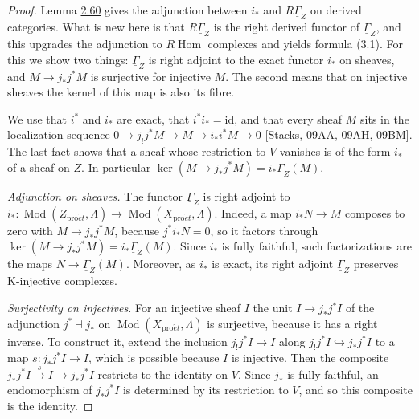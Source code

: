 \documentclass[11pt]{article}
\begin{document}
\begin{proof}[{Proof}]\label{bp258}%
Lemma \hyperref[bp185]{2.60} gives the adjunction between \(i_*\) and \(R\underline\Gamma_Z\) on derived categories. What is new here is that \(R\underline\Gamma_Z\) is the right derived functor of \(\underline\Gamma_Z\), and this upgrades the adjunction to \(R\!\operatorname{Hom}\) complexes and yields formula (3.1). For this we show two things: \(\underline\Gamma_Z\) is right adjoint to the exact functor \(i_*\) on sheaves, and \(M\to j_*j^*M\) is surjective for injective \(M\). The second means that on injective sheaves the kernel of this map is also its fibre.

We use that \(i^*\) and \(i_*\) are exact, that \(i^*i_*=\mathrm{id}\), and that every sheaf \(M\) sits in the localization sequence \(0\to j_!j^*M\to M\to i_*i^*M\to0\) [Stacks, \href{https://stacks.math.columbia.edu/tag/09AA}{09AA}, \href{https://stacks.math.columbia.edu/tag/09AH}{09AH}, \href{https://stacks.math.columbia.edu/tag/09BM}{09BM}]. The last fact shows that a sheaf whose restriction to \(V\) vanishes is of the form \(i_*\) of a sheaf on \(Z\). In particular \(\ker(M\to j_*j^*M)=i_*\underline\Gamma_Z(M)\).

\emph{Adjunction on sheaves.} The functor \(\underline\Gamma_Z\) is right adjoint to \(i_*:\operatorname{Mod}(Z_{\mathrm{pro}\acute{e}t},\Lambda)\to\operatorname{Mod}(X_{\mathrm{pro}\acute{e}t},\Lambda)\). Indeed, a map \(i_*N\to M\) composes to zero with \(M\to j_*j^*M\), because \(j^*i_*N=0\), so it factors through \(\ker(M\to j_*j^*M)=i_*\underline\Gamma_Z(M)\). Since \(i_*\) is fully faithful, such factorizations are the maps \(N\to\underline\Gamma_Z(M)\). Moreover, as \(i_*\) is exact, its right adjoint \(\underline\Gamma_Z\) preserves K-injective complexes.

\emph{Surjectivity on injectives.} For an injective sheaf \(I\) the unit \(I\to j_*j^*I\) of the adjunction \(j^*\dashv j_*\) on \(\operatorname{Mod}(X_{\mathrm{pro}\acute{e}t},\Lambda)\) is surjective, because it has a right inverse. To construct it, extend the inclusion \(j_!j^*I\to I\) along \(j_!j^*I\hookrightarrow j_*j^*I\) to a map \(s:j_*j^*I\to I\), which is possible because \(I\) is injective. Then the composite \(j_*j^*I\xrightarrow{s}I\to j_*j^*I\) restricts to the identity on \(V\). Since \(j_*\) is fully faithful, an endomorphism of \(j_*j^*I\) is determined by its restriction to \(V\), and so this composite is the identity.


\end{proof}
\end{document}
